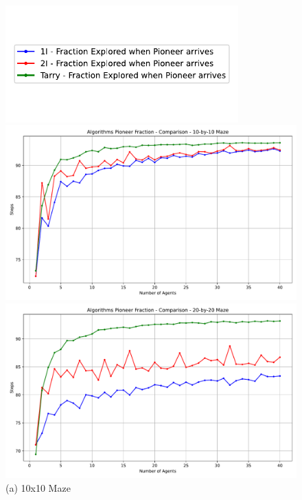 \begin{figure}[H]
    \centering
    \includegraphics[width=0.8\textwidth]{Cap3/no_comm_fraction_legend.pdf}
    \vspace{1em}
    \begin{minipage}[b]{0.45\textwidth}
        \centering
        \includegraphics[width=\textwidth]{Cap3/no_comm_fraction__10_by_10_maze.pdf}
        \caption{(a) 10x10 Maze}
        \label{fig_no_comm_fraction_10x10_maze}
    \end{minipage}
    \hfill
    \begin{minipage}[b]{0.45\textwidth}
        \centering
        \includegraphics[width=\textwidth]{Cap3/no_comm_fraction__20_by_20_maze.pdf}

\end{minipage}
\end{figure}
